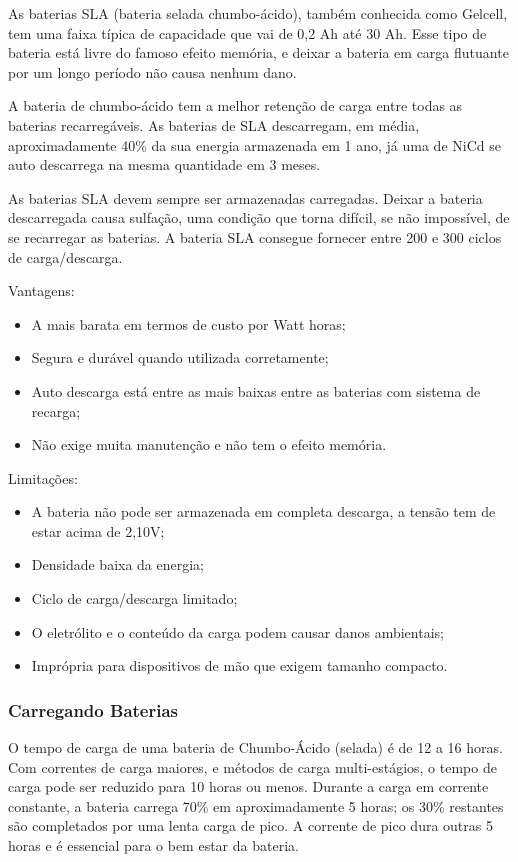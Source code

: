 As baterias SLA (bateria selada chumbo-ácido), também conhecida como Gelcell, tem uma faixa típica de capacidade que vai de 0,2 Ah até 30 Ah. Esse tipo de bateria está livre do famoso efeito memória, e deixar a bateria em carga flutuante por um longo período não causa nenhum dano.

A bateria de chumbo-ácido tem a melhor retenção de carga entre todas as baterias recarregáveis. As baterias de SLA descarregam, em média, aproximadamente 40\% da sua energia armazenada em 1 ano, já uma de NiCd se auto descarrega na mesma quantidade em 3 meses.

As baterias SLA devem sempre ser armazenadas carregadas. Deixar a bateria descarregada causa sulfação, uma condição que torna difícil, se não impossível, de se recarregar as baterias. A bateria SLA consegue fornecer entre 200 e 300 ciclos de carga/descarga.

Vantagens:

\begin{itemize}
	\item A mais barata em termos de custo por Watt horas;
	\item Segura e durável quando utilizada corretamente;
	\item Auto descarga está entre as mais baixas entre as baterias com sistema de recarga;
	\item Não exige muita manutenção e não tem o efeito memória.
\end{itemize}

Limitações:

\begin{itemize}
	\item A bateria não pode ser armazenada em completa descarga, a tensão tem de estar acima de 2,10V;
	\item Densidade baixa da energia;
	\item Ciclo de carga/descarga limitado;
	\item O eletrólito e o conteúdo da carga podem causar danos ambientais;
	\item Imprópria para dispositivos de mão que exigem tamanho compacto.
\end{itemize}

\subsubsection{Carregando Baterias}

O tempo de carga de uma bateria de Chumbo-Ácido (selada) é de 12 a 16 horas. Com correntes de carga maiores, e métodos de carga multi-estágios, o tempo de carga pode ser reduzido para 10 horas ou menos. Durante a carga em corrente constante, a bateria carrega 70\% em aproximadamente 5 horas; os 30\% restantes são completados por uma lenta carga de pico. A corrente de pico dura outras 5 horas e é essencial para o bem estar da bateria.

